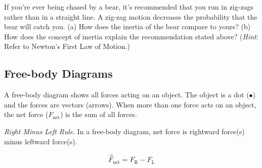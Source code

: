\documentclass{article}
\numberwithin{equation}{section}
\numberwithin{figure}{section}
\begin{document}
\begin{exercise} \label{MB3Xar}
If you’re ever being chased by a bear, it’s recommended that you run in zig-zags rather than in a straight line. A zig-zag motion decreases the probability that the bear will catch you. (a) How does the inertia of the bear compare to yours? (b) How does the concept of inertia explain the recommendation stated above? (\textit{Hint}: Refer to Newton's First Law of Motion.)
\end{exercise}
\cyanhrule

\clearpage
\subsection{Free-body Diagrams} \label{SdNOfY}

A \gls{free-body diagram} shows all forces acting on an object. The object is a dot ($\bullet$) and the forces are vectors (arrows). When more than one force acts on an object, the \gls{net force} ($F_{\text{net}}$) is the sum of all forces. 

\begin{mdframed}[backgroundcolor=black!10]
\textit{Right Minus Left Rule}. In a free-body diagram, net force is rightward force(s) minus leftward force(s).

\begin{center}
\end{center}
\vspace{-1em}

\begin{equation}
    \vec{F}_{\text{net}} = F_{\text{R}} - F_{\text{L}}
\end{equation}
\end{mdframed}

\end{document}
